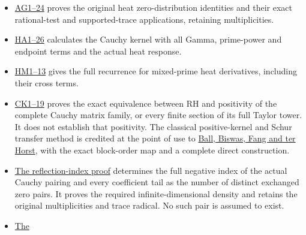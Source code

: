 \documentclass[
]{article}
\providecommand{\tightlist}{%
  \setlength{\itemsep}{0pt}\setlength{\parskip}{0pt}}
\begin{document}
\begin{itemize}
\tightlist
\item
  \href{https://github.com/KokunoYumeto/zeta-function-research-reader/blob/76f421965914beb133df797835f940849844dc4f/workbenches/splitzero-tandem/branches/tau-zero-prime-positivity/ACTUAL_HEAT_ZERO_DISTRIBUTION_VARIATION.md}{AG1--24}
  proves the original heat zero-distribution identities and their exact
  rational-test and supported-trace applications, retaining
  multiplicities.
\item
  \href{https://github.com/KokunoYumeto/zeta-function-research-reader/blob/76f421965914beb133df797835f940849844dc4f/workbenches/splitzero-tandem/branches/tau-zero-prime-positivity/HEAT_CAUCHY_ARITHMETIC_DERIVATION.md}{HA1--26}
  calculates the Cauchy kernel with all Gamma, prime-power and endpoint
  terms and the actual heat response.
\item
  \href{https://github.com/KokunoYumeto/zeta-function-research-reader/blob/76f421965914beb133df797835f940849844dc4f/workbenches/splitzero-tandem/branches/tau-zero-prime-positivity/HEAT_MIXED_PRIME_RECURRENCE.md}{HM1--13}
  gives the full recurrence for mixed-prime heat derivatives, including
  their cross terms.
\item
  \href{https://github.com/KokunoYumeto/zeta-function-research-reader/blob/76f421965914beb133df797835f940849844dc4f/workbenches/splitzero-tandem/branches/tau-zero-prime-positivity/CAUCHY_WEIL_POSITIVITY_CRITERION.md}{CK1--19}
  proves the exact equivalence between RH and positivity of the complete
  Cauchy matrix family, or every finite section of its full Taylor
  tower. It does not establish that positivity. The classical
  positive-kernel and Schur transfer method is credited at the point of
  use to \href{https://arxiv.org/abs/0705.2042v3}{Ball, Biswas, Fang and
  ter Horst}, with the exact block-order map and a complete direct
  construction.
\item
  \href{https://github.com/KokunoYumeto/zeta-function-research-reader/blob/76f421965914beb133df797835f940849844dc4f/workbenches/splitzero-tandem/branches/tau-zero-prime-positivity/CAUCHY_REFLECTION_INDEX_DERIVATION.md}{The
  reflection-index proof} determines the full negative index of the
  actual Cauchy pairing and every coefficient tail as the number of
  distinct exchanged zero pairs. It proves the required
  infinite-dimensional density and retains the original multiplicities
  and trace radical. No such pair is assumed to exist.
\item
  \href{https://github.com/KokunoYumeto/zeta-function-research-reader/blob/76f421965914beb133df797835f940849844dc4f/workbenches/splitzero-tandem/branches/tau-zero-prime-positivity/FINITE_JET_COMPLEMENT_AND_HEAT_TRUNCATION.md}{The
}
\end{itemize}
\end{document}
